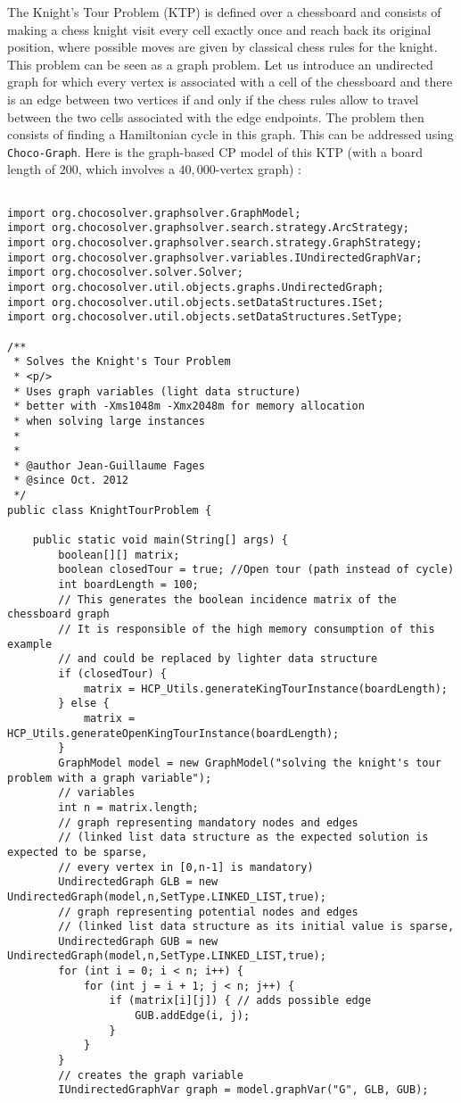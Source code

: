 \documentclass{article}
\begin{document}
The Knight's Tour Problem (KTP) is defined over a chessboard and consists of making a chess knight visit every cell exactly once and reach back its original position, where possible moves are given by classical chess rules for the knight. This problem can be seen as a graph problem. Let us introduce an undirected graph for which every vertex is associated with a cell of the chessboard and there is an edge between two vertices if and only if the chess rules allow to travel between the two cells associated with the edge endpoints. The problem then consists of finding a Hamiltonian cycle in this graph. This can be addressed using \texttt{Choco-Graph}. Here is the graph-based CP model of this KTP (with a board length of $200$, which involves a $40,000$-vertex graph) : 
\begin{lstlisting}

import org.chocosolver.graphsolver.GraphModel;
import org.chocosolver.graphsolver.search.strategy.ArcStrategy;
import org.chocosolver.graphsolver.search.strategy.GraphStrategy;
import org.chocosolver.graphsolver.variables.IUndirectedGraphVar;
import org.chocosolver.solver.Solver;
import org.chocosolver.util.objects.graphs.UndirectedGraph;
import org.chocosolver.util.objects.setDataStructures.ISet;
import org.chocosolver.util.objects.setDataStructures.SetType;

/**
 * Solves the Knight's Tour Problem
 * <p/>
 * Uses graph variables (light data structure)
 * better with -Xms1048m -Xmx2048m for memory allocation
 * when solving large instances
 *
 *
 * @author Jean-Guillaume Fages
 * @since Oct. 2012
 */
public class KnightTourProblem {

	public static void main(String[] args) {
		boolean[][] matrix;
		boolean closedTour = true; //Open tour (path instead of cycle)
		int boardLength = 100;
		// This generates the boolean incidence matrix of the chessboard graph
		// It is responsible of the high memory consumption of this example
		// and could be replaced by lighter data structure
		if (closedTour) {
			matrix = HCP_Utils.generateKingTourInstance(boardLength);
		} else {
			matrix = HCP_Utils.generateOpenKingTourInstance(boardLength);
		}
		GraphModel model = new GraphModel("solving the knight's tour problem with a graph variable");
		// variables
		int n = matrix.length;
		// graph representing mandatory nodes and edges
		// (linked list data structure as the expected solution is expected to be sparse,
		// every vertex in [0,n-1] is mandatory)
		UndirectedGraph GLB = new UndirectedGraph(model,n,SetType.LINKED_LIST,true);
		// graph representing potential nodes and edges
		// (linked list data structure as its initial value is sparse,
		UndirectedGraph GUB = new UndirectedGraph(model,n,SetType.LINKED_LIST,true);
		for (int i = 0; i < n; i++) {
			for (int j = i + 1; j < n; j++) {
				if (matrix[i][j]) { // adds possible edge
					GUB.addEdge(i, j);
				}
			}
		}
		// creates the graph variable
		IUndirectedGraphVar graph = model.graphVar("G", GLB, GUB);


\end{lstlisting}
\end{document}
